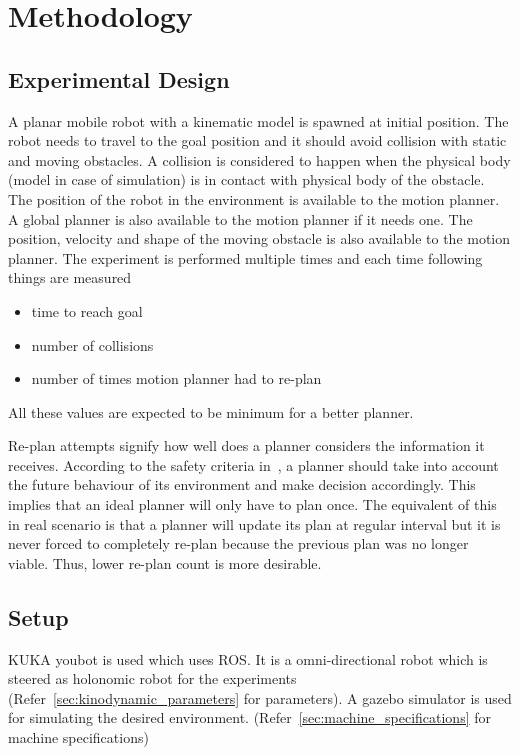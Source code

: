 \chapter{Methodology}

\section{Experimental Design}
\label{sec:experimental_design}
A planar mobile robot with a kinematic model is spawned at initial position. 
The robot needs to travel to the goal position and it should avoid collision with static and moving obstacles. 
A collision is considered to happen when the physical body (model in case of simulation)
is in contact with physical body of the obstacle.
The position of the robot in the environment is available to the motion planner.
A global planner is also available to the motion planner if it needs one.
The position, velocity and shape of the moving obstacle is also available to the motion
planner.
The experiment is performed multiple times and each time following things are measured
\begin{itemize}
    \item time to reach goal
    \item number of collisions
    \item number of times motion planner had to re-plan
\end{itemize}
All these values are expected to be minimum for a better planner.

Re-plan attempts signify how well does a planner considers the information it receives. According to
the safety criteria in~\cite{fraichard2007short}, a planner should take into account the future behaviour
of its environment and make decision accordingly. This implies that an ideal planner will only have
to plan once. The equivalent of this in real scenario is that a planner will update its plan at 
regular interval but it is never forced to completely re-plan because the previous plan was no longer 
viable. Thus, lower re-plan count is more desirable. 

\section{Setup}
\label{sec:setup}

KUKA youbot\cite{bischoff2011kuka} is used which uses ROS\cite{quigley2009ros}. It is a 
omni-directional robot which is steered as holonomic robot for the experiments 
(Refer~\ref{sec:kinodynamic_parameters} for parameters). 
A gazebo simulator\cite{koenig2004design} is used for simulating the desired environment.
(Refer~\ref{sec:machine_specifications} for machine specifications)

